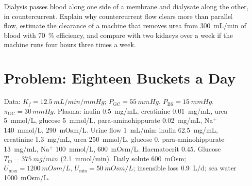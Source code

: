 \begin{exercise}[$\star\star\star$]\label{exo:b3:renal-osmoregulation:12}
Dialysis passes blood along one side of a membrane and dialysate along
the other, in countercurrent. Explain why countercurrent flow clears
more than parallel flow, estimate the clearance of a machine that
removes urea from \qty{300}{mL/min} of blood with \qty{70}{\%}
efficiency, and compare with two kidneys over a week if the machine
runs four hours three times a week.
\end{exercise}

\section{Problem: Eighteen Buckets a Day}

\begin{problem}
\label{pb:b3:renal-osmoregulation:1}
Data: $K_{f} = \qty{12.5}{mL/min/mmHg}$; $P_{\text{GC}} = \qty{55}{mmHg}$,
$P_{\text{BS}} = \qty{15}{mmHg}$, $\pi_{\text{GC}} = \qty{30}{mmHg}$.
Plasma: inulin \qty{0.5}{mg/mL}, creatinine \qty{0.01}{mg/mL}, urea
\qty{5}{mmol/L}, glucose \qty{5}{mmol/L}, para-aminohippurate
\qty{0.02}{mg/mL}, Na$^{+}$ \qty{140}{mmol/L}, 
\qty{290}{mOsm/L}. Urine flow \qty{1}{mL/min}: inulin \qty{62.5}{mg/mL},
creatinine \qty{1.3}{mg/mL}, urea \qty{250}{mmol/L}, glucose $0$,
para-aminohippurate \qty{13}{mg/mL}, Na$^{+}$ \qty{100}{mmol/L},
 \qty{600}{mOsm/L}. Haematocrit $0.45$. Glucose $T_{m} =
\qty{375}{mg/min}$ (\qty{2.1}{mmol/min}). Daily solute \qty{600}{mOsm};
$U_{\max} = \qty{1200}{mOsm/L}$, $U_{\min} = \qty{50}{mOsm/L}$;
insensible loss \qty{0.9}{L/d}; sea water \qty{1000}{mOsm/L}.


\end{problem}
